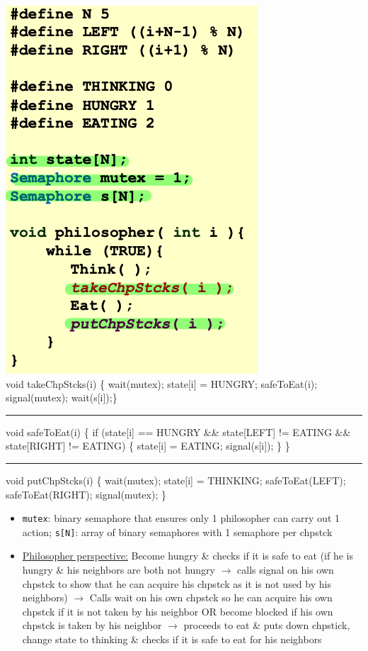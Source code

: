 \documentclass[landscape]{article}
\begin{document}
\begin{multicols*}{6}
\begin{itemize}
\begin{multicols}{2}
        \includegraphics[width=1.0\linewidth]{12_tanenbaum.png} \\
        \columnbreak
        void takeChpStcks(i) \{ wait(mutex); state[i] = HUNGRY; safeToEat(i); signal(mutex); wait(s[i]);\} \hrule
        void safeToEat(i) \{ if (state[i] == HUNGRY \&\& state[LEFT] != EATING \&\& state[RIGHT] != EATING) \{ state[i] = EATING; signal(s[i]); \} \} \hrule
        void putChpStcks(i) \{ wait(mutex); state[i] = THINKING; safeToEat(LEFT); safeToEat(RIGHT); signal(mutex); \}
        \end{multicols}
        \begin{itemize}
          \item \verb|mutex|: binary semaphore that ensures only 1 philosopher can carry out 1 action; \verb|s[N]|: array of binary semaphores with 1 semaphore per chpstck
          \item \underline{Philosopher perspective:} Become hungry \& checks if it is safe to eat (if he is hungry \& his neighbors are both not hungry $\rightarrow$ calls signal on his own chpstck to show that he can acquire his chpstck as it is not used by his neighbors) $\rightarrow$ Calls wait on his own chpstck so he can acquire his own chpstck if it is not taken by his neighbor OR become blocked if his own chpstck is taken by his neighbor $\rightarrow$ proceeds to eat \& puts down chpstick, change state to thinking \& checks if it is safe to eat for his neighbors

\end{itemize}
\end{itemize}
\end{multicols*}
\end{document}
